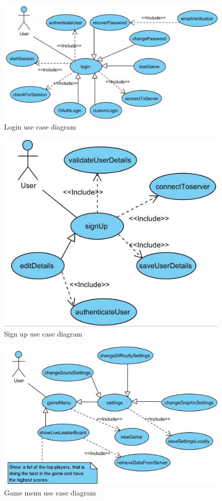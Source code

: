 \documentclass[letterpaper]{article}
\begin{document}
		\begin{figure}[ht!]
		\centering
		\includegraphics[width=180mm]{login}
		\caption{Login use case diagram}
		\label{overflow}
		\end{figure}
		
		\vspace{0.2in}
		
		\begin{figure}[ht!]
		\centering
		\includegraphics[width=180mm]{signup}
		\caption{Sign up use case diagram}
		\label{overflow}
		\end{figure}
		
		\vspace{0.2in}
		
		\begin{figure}[ht!]
		\centering
		\includegraphics[width=180mm]{game_menu}
		\caption{Game menu use case diagram}
		\label{overflow}
		\end{figure}
\end{document}
